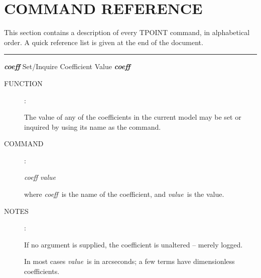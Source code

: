 \pagebreak
\section{COMMAND REFERENCE}
This section contains a description of every TPOINT
command, in alphabetical order.  A quick reference list
is given at the end of the document.


\goodbreak
\rule{\textwidth}{0.3mm}
{\Large {\bf \it coeff} \hfill Set/Inquire Coefficient Value \hfill
                                                      {\bf \it coeff}}
\begin{description}
\item [FUNCTION]:

The value of any of the coefficients in the current model
may be set or inquired by using its name as the command.

\item [COMMAND]:

\begin{cmd}
\> \> {\it coeff} {\it value}
\end{cmd}

where {\it coeff}\, is the name of the coefficient, and {\it value}\,
is the value.

\item [NOTES]:

If no argument is supplied, the coefficient is unaltered -- merely
logged.

In most cases {\it value}\, is in arcseconds; a few terms have
dimensionless coefficients.

\end{description}


